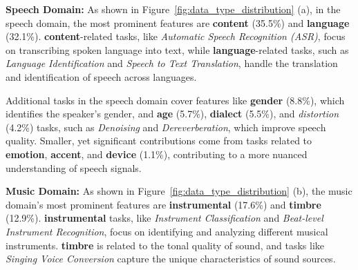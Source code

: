 
\textbf{Speech Domain:}
As shown in Figure~\ref{fig:data_type_distribution} (a), in the speech domain, the most prominent features are \textbf{content} (35.5\%) and \textbf{language} (32.1\%). \textbf{content}-related tasks, like \textit{Automatic Speech Recognition (ASR)}, focus on transcribing spoken language into text, while \textbf{language}-related tasks, such as \textit{Language Identification} and \textit{Speech to Text Translation}, handle the translation and identification of speech across languages.

Additional tasks in the speech domain cover features like \textbf{gender} (8.8\%), which identifies the speaker’s gender, and \textbf{age} (5.7\%), \textbf{dialect} (5.5\%), and \textit{distortion} (4.2\%) tasks, such as \textit{Denoising} and \textit{Dereverberation}, which improve speech quality. Smaller, yet significant contributions come from tasks related to \textbf{emotion}, \textbf{accent}, and \textbf{device} (1.1\%), contributing to a more nuanced understanding of speech signals.

\textbf{Music Domain:}
As shown in Figure~\ref{fig:data_type_distribution} (b), the music domain's most prominent features are \textbf{instrumental} (17.6\%) and \textbf{timbre} (12.9\%). \textbf{instrumental} tasks, like \textit{Instrument Classification} and \textit{Beat-level Instrument Recognition}, focus on identifying and analyzing different musical instruments. \textbf{timbre} is related to the tonal quality of sound, and tasks like \textit{Singing Voice Conversion} capture the unique characteristics of sound sources.

